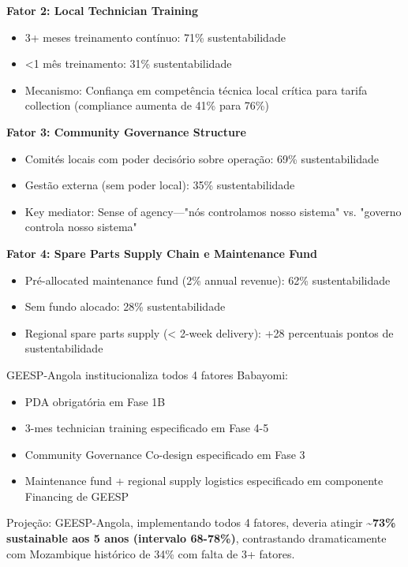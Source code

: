\documentclass[12pt, a4paper]{article}
\begin{document}
\textbf{Fator 2: Local Technician Training}
\begin{itemize}
\item 3+ meses treinamento contínuo: 71\% sustentabilidade
\item <1 mês treinamento: 31\% sustentabilidade
\item Mecanismo: Confiança em competência técnica local crítica para tarifa collection (compliance aumenta de 41\% para 76\%)
\end{itemize}

\textbf{Fator 3: Community Governance Structure}
\begin{itemize}
\item Comités locais com poder decisório sobre operação: 69\% sustentabilidade
\item Gestão externa (sem poder local): 35\% sustentabilidade
\item Key mediator: Sense of agency—"nós controlamos nosso sistema" vs. "governo controla nosso sistema"
\end{itemize}

\textbf{Fator 4: Spare Parts Supply Chain e Maintenance Fund}
\begin{itemize}
\item Pré-allocated maintenance fund (2\% annual revenue): 62\% sustentabilidade
\item Sem fundo alocado: 28\% sustentabilidade
\item Regional spare parts supply (< 2-week delivery): +28 percentuais pontos de sustentabilidade
\end{itemize}

GEESP-Angola institucionaliza todos 4 fatores Babayomi:
\begin{itemize}
\item [$\checkmark$] PDA obrigatória em Fase 1B
\item [$\checkmark$] 3-mes technician training especificado em Fase 4-5
\item [$\checkmark$] Community Governance Co-design especificado em Fase 3
\item [$\checkmark$] Maintenance fund + regional supply logistics especificado em componente Financing de GEESP
\end{itemize}

Projeção: GEESP-Angola, implementando todos 4 fatores, deveria atingir \textbf{\textasciitilde{}73\% sustainable aos 5 anos (intervalo 68-78\%)}, contrastando dramaticamente com Mozambique histórico de 34\% com falta de 3+ fatores.
\end{document}
